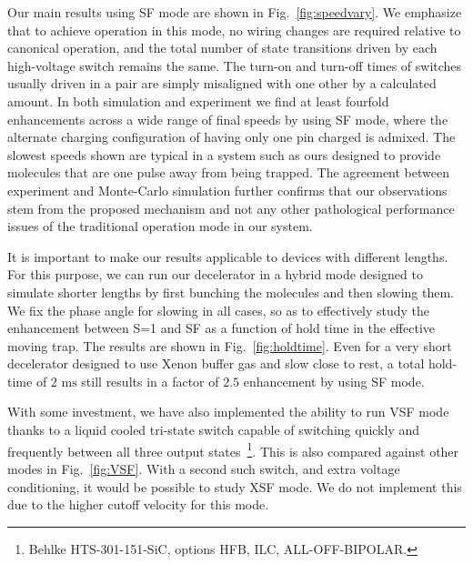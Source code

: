 \documentclass[%
 reprint,
 amsmath,amssymb,
 aps,
prl,
]{revtex4-1}
\begin{document}
Our main results using SF mode are shown in Fig.~\ref{fig:speedvary}.
We emphasize that to achieve operation in this mode, no wiring changes are required relative to canonical operation, and the total number of state transitions driven by each high-voltage switch remains the same. 
The turn-on and turn-off times of switches usually driven in a pair are simply misaligned with one other by a calculated amount.
In both simulation and experiment we find at least fourfold enhancements across a wide range of final speeds by using SF mode, where the alternate charging configuration of having only one pin charged is admixed. 
The slowest speeds shown are typical in a system such as ours designed to provide molecules that are one pulse away from being trapped. 
The agreement between experiment and Monte-Carlo simulation further confirms that our observations stem from the proposed mechanism and not any other pathological performance issues of the traditional operation mode in our system.

It is important to make our results applicable to devices with different lengths. 
For this purpose, we can run our decelerator in a hybrid mode designed to simulate shorter lengths by first bunching the molecules and then slowing them. 
We fix the phase angle for slowing in all cases, so as to effectively study the enhancement between S=1 and SF as a function of hold time in the effective moving trap. 
The results are shown in Fig.~\ref{fig:holdtime}. 
Even for a very short decelerator designed to use Xenon buffer gas and slow close to rest, a total hold-time of $2\text{ ms}$ still results in a factor of $2.5$ enhancement by using SF mode.

With some investment, we have also implemented the ability to run VSF mode thanks to a liquid cooled tri-state switch capable of switching quickly and frequently between all three output states~\footnote{Behlke HTS-301-151-SiC, options HFB, ILC, ALL-OFF-BIPOLAR.}. This is also compared against other modes in Fig.~\ref{fig:VSF}. With a second such switch, and extra voltage conditioning, it would be possible to study XSF mode. We do not implement this due to the higher cutoff velocity for this mode.
\end{document}
